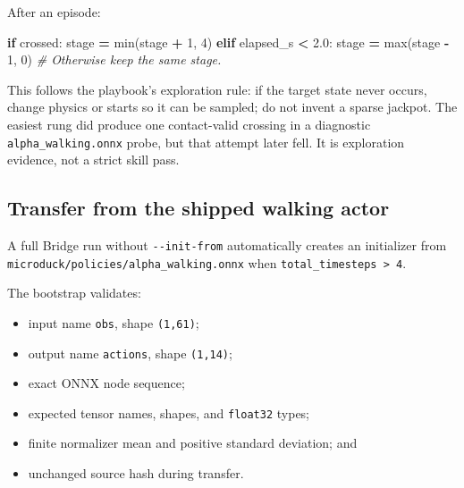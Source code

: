 \documentclass[
  american,
  11pt,
  letterpaper,
]{article}
\newenvironment{Shaded}{\begin{snugshade}}{\end{snugshade}}
\newcommand{\BuiltInTok}[1]{#1}
\newcommand{\CommentTok}[1]{\textcolor[rgb]{0.56,0.35,0.01}{\textit{#1}}}
\newcommand{\ControlFlowTok}[1]{\textcolor[rgb]{0.13,0.29,0.53}{\textbf{#1}}}
\newcommand{\DecValTok}[1]{\textcolor[rgb]{0.00,0.00,0.81}{#1}}
\newcommand{\FloatTok}[1]{\textcolor[rgb]{0.00,0.00,0.81}{#1}}
\newcommand{\NormalTok}[1]{#1}
\newcommand{\OperatorTok}[1]{\textcolor[rgb]{0.81,0.36,0.00}{\textbf{#1}}}
\providecommand{\tightlist}{%
  \setlength{\itemsep}{0pt}\setlength{\parskip}{0pt}}
\renewenvironment{Shaded}{\par\smallskip}{\par\smallskip}
\begin{document}
After an episode:

\begin{Shaded}
\begin{Highlighting}[]
\ControlFlowTok{if}\NormalTok{ crossed:}
\NormalTok{    stage }\OperatorTok{=} \BuiltInTok{min}\NormalTok{(stage }\OperatorTok{+} \DecValTok{1}\NormalTok{, }\DecValTok{4}\NormalTok{)}
\ControlFlowTok{elif}\NormalTok{ elapsed\_s }\OperatorTok{\textless{}} \FloatTok{2.0}\NormalTok{:}
\NormalTok{    stage }\OperatorTok{=} \BuiltInTok{max}\NormalTok{(stage }\OperatorTok{{-}} \DecValTok{1}\NormalTok{, }\DecValTok{0}\NormalTok{)}
\CommentTok{\# Otherwise keep the same stage.}
\end{Highlighting}
\end{Shaded}

This follows the playbook's exploration rule: if the target state never
occurs, change physics or starts so it can be sampled; do not invent a
sparse jackpot. The easiest rung did produce one contact-valid crossing
in a diagnostic \texttt{alpha\_\allowbreak{}walking.\allowbreak{}onnx}
probe, but that attempt later fell. It is exploration evidence, not a
strict skill pass.

\subsection{Transfer from the shipped walking
actor}\label{transfer-from-the-shipped-walking-actor}

A full Bridge run without \texttt{-\/-init-from} automatically creates
an initializer from
\texttt{microduc\allowbreak{}k/\allowbreak{}policies\allowbreak{}/\allowbreak{}alpha\_\allowbreak{}walking.\allowbreak{}onnx}
when \texttt{total\_timesteps\ \textgreater{}\ 4}.

The bootstrap validates:

\begin{itemize}
\tightlist
\item
  input name \texttt{obs}, shape \texttt{(1,61)};
\item
  output name \texttt{actions}, shape \texttt{(1,14)};
\item
  exact ONNX node sequence;
\item
  expected tensor names, shapes, and \texttt{float32} types;
\item
  finite normalizer mean and positive standard deviation; and
\item
  unchanged source hash during transfer.
\end{itemize}
\end{document}

